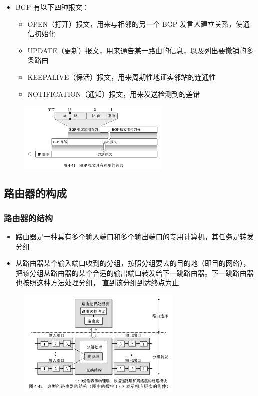 \documentclass[cs4size,a4paper,10pt]{ctexart}
\begin{document}
	\begin{itemize}
		\item BGP 有以下四种报文：
		\begin{itemize}
			\item OPEN（打开）报文，用来与相邻的另一个 BGP 发言人建立关系，使通信初始化
			\item UPDATE（更新）报文，用来通告某一路由的信息，以及列出要撤销的多条路由
			\item KEEPALIVE（保活）报文，用来周期性地证实邻站的连通性
			\item NOTIFICATION（通知）报文，用来发送检测到的差错
		\end{itemize}
	\end{itemize}

	\begin{figure}[H]
		\centering
		\includegraphics[width=0.65\textwidth]{img/4.41}
	\end{figure}

	\subsection{路由器的构成}

	\subsubsection{路由器的结构}

	\begin{itemize}
		\item 路由器是一种具有多个输入端口和多个输出端口的专用计算机，其任务是转发分组
		\item 从路由器某个输入端口收到的分组，按照分组要去的目的地（即目的网络），把该分组从路由器的某个合适的输出端口转发给下一跳路由器。下一跳路由器也按照这种方法处理分组， 直到该分组到达终点为止
	\end{itemize}
	\begin{figure}[H]
		\centering
		\includegraphics[width=0.7\textwidth]{img/4.42}
	\end{figure}
\end{document}
